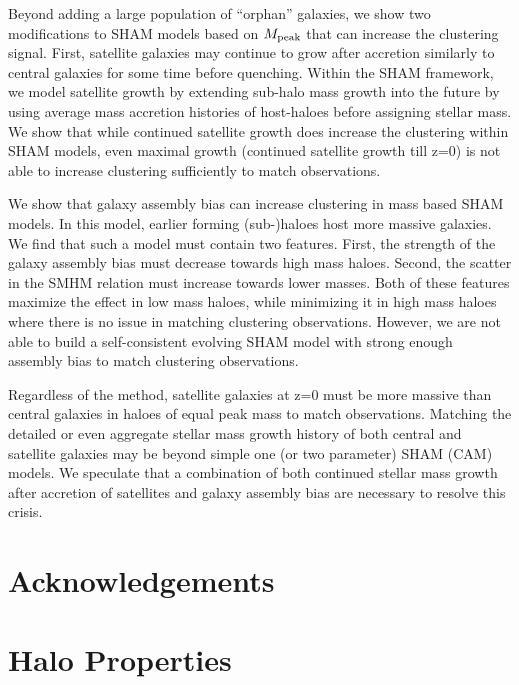 \documentclass[a4paper,fleqn,usenatbib]{mnras}
\begin{document}
Beyond adding a large population of ``orphan'' galaxies, we show two modifications to SHAM models based on $M_{\rm peak}$ that can increase the clustering signal.  First, satellite galaxies may continue to grow after accretion similarly to central galaxies for some time before quenching.  Within the SHAM framework, we model satellite growth by extending sub-halo mass growth into the future by using average mass accretion histories of host-haloes before assigning stellar mass.  We show that while continued satellite growth does increase the clustering within SHAM models, even maximal growth (continued satellite growth till z=0) is not able to increase clustering sufficiently to match observations.    

We show that galaxy assembly bias can increase clustering in mass based SHAM models.  In this model, earlier forming (sub-)haloes host more massive galaxies.  We find that such a model must contain two features.  First, the strength of the galaxy assembly bias must decrease towards high mass haloes.  Second, the scatter in the SMHM relation must increase towards lower masses.  Both of these features maximize the effect in low mass haloes, while minimizing it in high mass haloes where there is no issue in matching clustering observations.  However, we are not able to build a self-consistent evolving SHAM model with strong enough assembly bias to match clustering observations.

Regardless of the method, satellite galaxies at z=0 must be more massive than central galaxies in haloes of equal peak mass to match observations.  Matching the detailed or even aggregate stellar mass growth history of both central and satellite galaxies may be beyond simple one (or two parameter) SHAM (CAM) models.  We speculate that a combination of both continued stellar mass growth after accretion of satellites and galaxy assembly bias are necessary to resolve this crisis.


\section*{Acknowledgements}

%

 

\appendix

\section{Halo Properties}
\label{sec:halo_properties}
\end{document}

